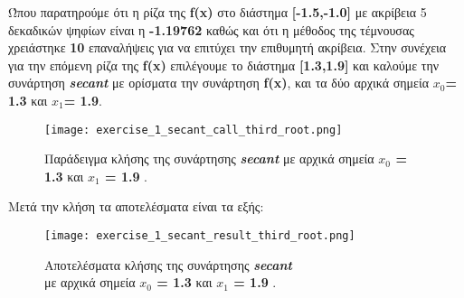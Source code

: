 \documentclass[First Project.tex]{subfiles}
\begin{document}
Ώπου παρατηρούμε ότι η ρίζα της \textlatin{\textbf{f(x)}} στο διάστημα \textlatin{\textbf{[-1.5,-1.0]}} με ακρίβεια 5 δεκαδικών ψηφίων 
είναι η \textbf{-1.19762} καθώς και ότι η μέθοδος της τέμνουσας χρειάστηκε \textbf{10} επαναλήψεις για να επιτύχει την 
επιθυμητή ακρίβεια. Στην συνέχεια για την επόμενη ρίζα της \textlatin{\textbf{f(x)}} επιλέγουμε το διάστημα \textlatin{\textbf{[1.3,1.9]}} και
καλούμε την συνάρτηση \textit{\textlatin{\textbf{secant}}} με ορίσματα την συνάρτηση \textlatin{\textbf{f(x)}}, και τα δύο αρχικά σημεία 
\textlatin{\textbf{$x_{0}$= 1.3}} και \textlatin{\textbf{$x_{1}$= 1.9}}.
\vspace{5px}
\begin{figure}[h!]
    \centering
    \captionsetup{justification=centering}
    \begin{center}
        \texttt{[image: exercise\_1\_secant\_call\_third\_root.png]}    
        \caption{ Παράδειγμα κλήσης της συνάρτησης \textit{\textlatin{\textbf{secant}}} με αρχικά σημεία \textbf{\textlatin{$x_{0}$ = 1.3}} 
                    και \textbf{\textlatin{$x_{1}$ = 1.9}} .}
    \end{center}
\end{figure}


Μετά την κλήση τα αποτελέσματα είναι τα εξής:
\vspace{5px}
\begin{figure}[h!]
    \centering
    \captionsetup{justification=centering}
    \begin{center}
    \texttt{[image: exercise\_1\_secant\_result\_third\_root.png]}    
    \caption{ Αποτελέσματα κλήσης της συνάρτησης \textit{\textlatin{\textbf{secant}}} \\ με αρχικά σημεία \textbf{\textlatin{$x_{0}$ = 1.3}} 
                και \textbf{\textlatin{$x_{1}$ = 1.9}} . }
    \end{center}
\end{figure}
\end{document}
